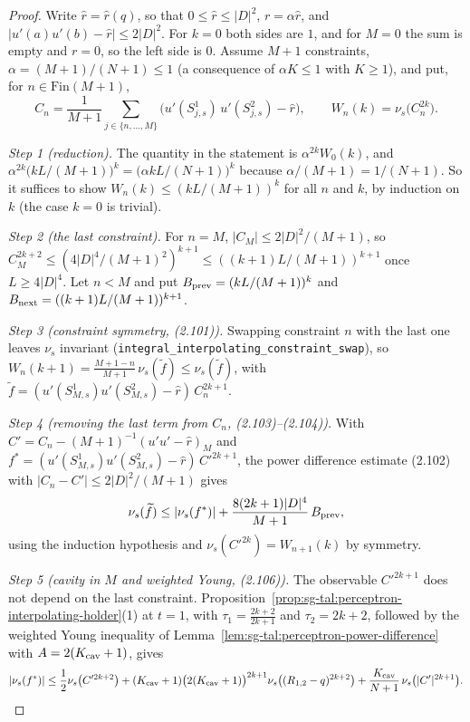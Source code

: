 \begin{proof}
  \leanok
Write $\widehat r=\widehat r(q)$, so that $0\le\widehat r\le|D|^2$, $r=\alpha\widehat r$, and
$|u'(a)u'(b)-\widehat r|\le 2|D|^2$. For $k=0$ both sides are $1$, and for $M=0$ the sum is empty and
$r=0$, so the left side is $0$. Assume $M+1$ constraints, $\alpha=(M+1)/(N+1)\le 1$ (a consequence of
$\alpha K\le 1$ with $K\ge1$), and put, for $n\in\mathrm{Fin}(M+1)$,
\[
 C_n=\frac1{M+1}\sum_{j\in\{n,\dots,M\}}\bigl(u'(S^1_{j,s})\,u'(S^2_{j,s})-\widehat r\bigr),\qquad
 W_n(k)=\nu_s\bigl(C_n^{2k}\bigr).
\]

\emph{Step 1 (reduction).} The quantity in the statement is $\alpha^{2k}W_0(k)$, and
$\alpha^{2k}\bigl(kL/(M+1)\bigr)^k=\bigl(\alpha kL/(N+1)\bigr)^k$ because $\alpha/(M+1)=1/(N+1)$. So it suffices to
show $W_n(k)\le(kL/(M+1))^k$ for all $n$ and $k$, by induction on $k$ (the case $k=0$ is trivial).

\emph{Step 2 (the last constraint).} For $n=M$, $|C_M|\le 2|D|^2/(M+1)$, so
$C_M^{2k+2}\le(4|D|^4/(M+1)^2)^{k+1}\le((k+1)L/(M+1))^{k+1}$ once $L\ge4|D|^4$. Let $n<M$ and put
$B_{\rm prev}=(kL/(M+1))^k$ and $B_{\rm next}=((k+1)L/(M+1))^{k+1}$.

\emph{Step 3 (constraint symmetry, (2.101)).} Swapping constraint $n$ with the last one leaves $\nu_s$ invariant
(\texttt{integral\_interpolating\_constraint\_swap}), so
$W_n(k+1)=\frac{M+1-n}{M+1}\,\nu_s(\widetilde f)\le\nu_s(\widetilde f)$, with
$\widetilde f=(u'(S^1_{M,s})u'(S^2_{M,s})-\widehat r)\,C_n^{2k+1}$.

\emph{Step 4 (removing the last term from $C_n$, (2.103)--(2.104)).} With $C'=C_n-(M+1)^{-1}(u'u'-\widehat r)_M$
and $f^*=(u'(S^1_{M,s})u'(S^2_{M,s})-\widehat r)\,C'^{2k+1}$, the power difference estimate (2.102) with
$|C_n-C'|\le 2|D|^2/(M+1)$ gives
\[
 \nu_s(\widetilde f)\le|\nu_s(f^*)|+\frac{8(2k+1)|D|^4}{M+1}\,B_{\rm prev},
\]
using the induction hypothesis and $\nu_s(C'^{2k})=W_{n+1}(k)$ by symmetry.

\emph{Step 5 (cavity in $M$ and weighted Young, (2.106)).} The observable $C'^{2k+1}$ does not depend on the
last constraint. Proposition~\ref{prop:sg-tal:perceptron-interpolating-holder}(1) at $t=1$, with $\tau_1=\frac{2k+2}{2k+1}$
and $\tau_2=2k+2$, followed by the weighted Young inequality of Lemma~\ref{lem:sg-tal:perceptron-power-difference} with
$A=2(K_{\rm cav}+1)$, gives
\[
 |\nu_s(f^*)|\le\frac12\nu_s\bigl(C'^{2k+2}\bigr)+(K_{\rm cav}+1)\bigl(2(K_{\rm cav}+1)\bigr)^{2k+1}
 \nu_s\bigl((R_{1,2}-q)^{2k+2}\bigr)+\frac{K_{\rm cav}}{N+1}\,\nu_s\bigl(|C'|^{2k+1}\bigr).
\]


\end{proof}

